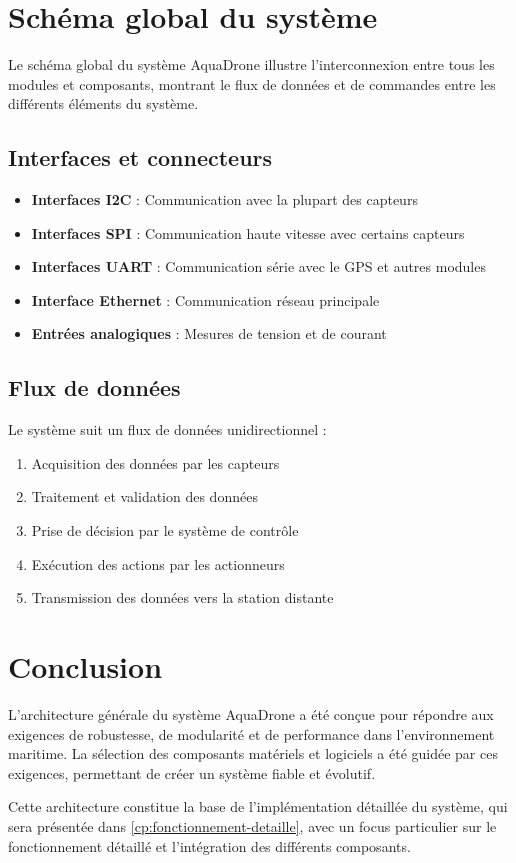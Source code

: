 {\section{Schéma global du système}
Le schéma global du système AquaDrone illustre l'interconnexion entre tous les modules et composants, montrant le flux de données et de commandes entre les différents éléments du système.

\subsection{Interfaces et connecteurs}
\begin{itemize}
    \item \textbf{Interfaces I2C} : Communication avec la plupart des capteurs
    \item \textbf{Interfaces SPI} : Communication haute vitesse avec certains capteurs
    \item \textbf{Interfaces UART} : Communication série avec le GPS et autres modules
    \item \textbf{Interface Ethernet} : Communication réseau principale
    \item \textbf{Entrées analogiques} : Mesures de tension et de courant
\end{itemize}

\subsection{Flux de données}
Le système suit un flux de données unidirectionnel :
\begin{enumerate}
    \item Acquisition des données par les capteurs
    \item Traitement et validation des données
    \item Prise de décision par le système de contrôle
    \item Exécution des actions par les actionneurs
    \item Transmission des données vers la station distante
\end{enumerate}

\section{Conclusion}
L'architecture générale du système AquaDrone a été conçue pour répondre aux exigences de robustesse, de modularité et de performance dans l'environnement maritime. La sélection des composants matériels et logiciels a été guidée par ces exigences, permettant de créer un système fiable et évolutif.

Cette architecture constitue la base de l'implémentation détaillée du système, qui sera présentée dans \autoref{cp:fonctionnement-detaille}, avec un focus particulier sur le fonctionnement détaillé et l'intégration des différents composants.

} 